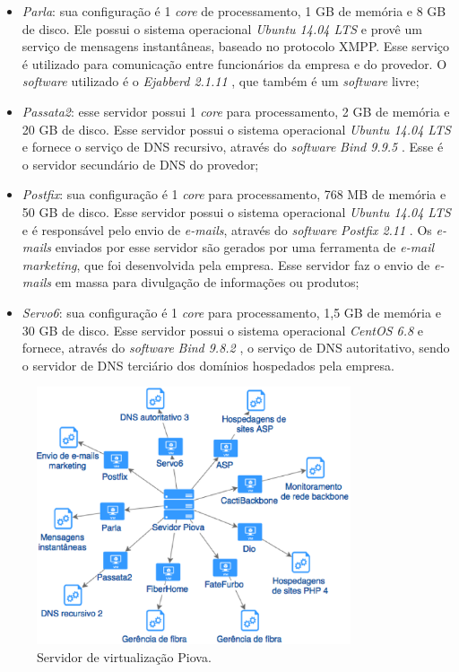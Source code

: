 \begin{itemize}
 \item \textit{Parla}: sua configuração é 1 \textit{core} de processamento, 1 GB de memória e 8 GB de disco. Ele possui o sistema
 operacional \textit{Ubuntu 14.04 \ac{LTS}} \cite{ubuntu} e provê um serviço de mensagens instantâneas, baseado no protocolo \ac{XMPP}. Esse 
 serviço é utilizado para comunicação entre funcionários da empresa e do provedor. O \textit{software} utilizado é o \textit{Ejabberd 2.1.11}
 \cite{ejabberd}, que também é um \textit{software} livre;

 \item \textit{Passata2}: esse servidor possui 1 \textit{core} para processamento, 2 GB de memória e 20 GB de disco. Esse servidor possui o 
 sistema operacional \textit{Ubuntu 14.04 \ac{LTS}} \cite{ubuntu} e fornece o serviço de \ac{DNS} recursivo, através do \textit{software} 
 \textit{Bind 9.9.5} \cite{bind}. Esse é o servidor secundário de \ac{DNS} do provedor;
 
 \item \textit{Postfix}: sua configuração é 1 \textit{core} para processamento, 768 MB de memória e 50 GB de disco. Esse servidor possui o 
 sistema operacional \textit{Ubuntu 14.04 \ac{LTS}} \cite{ubuntu} e é responsável pelo envio de \textit{e-mails}, através do \textit{software} 
 \textit{Postfix 2.11} \cite{postfix}. Os \textit{e-mails} enviados por esse servidor são gerados por uma ferramenta de \textit{e-mail marketing}, que foi
 desenvolvida pela empresa. Esse servidor faz o envio de \textit{e-mails} em massa para divulgação de informações ou produtos;
 
 \item \textit{Servo6}: sua configuração é 1 \textit{core} para processamento, 1,5 GB de memória e 30 GB de disco. Esse servidor possui o 
 sistema operacional \textit{CentOS 6.8} e fornece, através do \textit{software} \textit{Bind 9.8.2} \cite{bind}, o serviço de \ac{DNS} 
 autoritativo, sendo o servidor de \ac{DNS} terciário dos domínios hospedados pela empresa.
\end{itemize}

\begin{figure}[h!]
 \centering
 \includegraphics[width=350px]{img/servidor_piova.eps}
 \caption{Servidor de virtualização Piova.}
 \label{fig:servidor_piova}
\end{figure}


